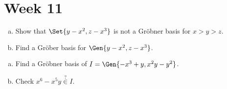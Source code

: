 
\section{Week 11}

\begin{exercise} \mbox{}
  \begin{enumerate}[(a)]
    \item Show that $\Set{ y-x^2, z-x^3 }$ is not a Gr\"obner basis for $x>y>z$.
    \item Find a Gr\"ober basis for $\Gen{ y-x^2, z-x^3 }$.
  \end{enumerate}
\end{exercise}

\begin{exercise} \mbox{}
  \begin{enumerate}[(a)]
    \item Find a Gr\"obner basis of $I = \Gen{ -x^3+y, x^2y - y^2 }$.
    \item Check $x^6 - x^5y \overset{?}{\in} I$.
  \end{enumerate}
\end{exercise}
